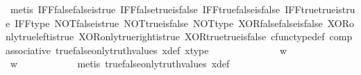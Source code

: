 \begin{isabellebody}
\ {\isacharparenleft}{\kern0pt}metis\ IFF{\isacharunderscore}{\kern0pt}false{\isacharunderscore}{\kern0pt}false{\isacharunderscore}{\kern0pt}is{\isacharunderscore}{\kern0pt}true\ IFF{\isacharunderscore}{\kern0pt}false{\isacharunderscore}{\kern0pt}true{\isacharunderscore}{\kern0pt}is{\isacharunderscore}{\kern0pt}false\ IFF{\isacharunderscore}{\kern0pt}true{\isacharunderscore}{\kern0pt}false{\isacharunderscore}{\kern0pt}is{\isacharunderscore}{\kern0pt}false\ IFF{\isacharunderscore}{\kern0pt}true{\isacharunderscore}{\kern0pt}true{\isacharunderscore}{\kern0pt}is{\isacharunderscore}{\kern0pt}true\ IFF{\isacharunderscore}{\kern0pt}type\ NOT{\isacharunderscore}{\kern0pt}false{\isacharunderscore}{\kern0pt}is{\isacharunderscore}{\kern0pt}true\ NOT{\isacharunderscore}{\kern0pt}true{\isacharunderscore}{\kern0pt}is{\isacharunderscore}{\kern0pt}false\ NOT{\isacharunderscore}{\kern0pt}type\ XOR{\isacharunderscore}{\kern0pt}false{\isacharunderscore}{\kern0pt}false{\isacharunderscore}{\kern0pt}is{\isacharunderscore}{\kern0pt}false\ XOR{\isacharunderscore}{\kern0pt}only{\isacharunderscore}{\kern0pt}true{\isacharunderscore}{\kern0pt}left{\isacharunderscore}{\kern0pt}is{\isacharunderscore}{\kern0pt}true\ XOR{\isacharunderscore}{\kern0pt}only{\isacharunderscore}{\kern0pt}true{\isacharunderscore}{\kern0pt}right{\isacharunderscore}{\kern0pt}is{\isacharunderscore}{\kern0pt}true\ XOR{\isacharunderscore}{\kern0pt}true{\isacharunderscore}{\kern0pt}true{\isacharunderscore}{\kern0pt}is{\isacharunderscore}{\kern0pt}false\ cfunc{\isacharunderscore}{\kern0pt}type{\isacharunderscore}{\kern0pt}def\ comp{\isacharunderscore}{\kern0pt}associative\ true{\isacharunderscore}{\kern0pt}false{\isacharunderscore}{\kern0pt}only{\isacharunderscore}{\kern0pt}truth{\isacharunderscore}{\kern0pt}values\ x{\isacharunderscore}{\kern0pt}def\ x{\isacharunderscore}{\kern0pt}type{\isacharparenright}{\kern0pt}\isanewline
\ \ \ \ \isamarkupfalse%
\ \isanewline
\ \ \ \ \ \ \isamarkupfalse%
\ {\isachardoublequoteopen}w\ {\isasymnoteq}\ {\isasymt}{\isachardoublequoteclose}\isanewline
\ \ \ \ \ \ \isamarkupfalse%
\ \isamarkupfalse%
\ {\isachardoublequoteopen}w\ {\isacharequal}{\kern0pt}\ {\isasymf}{\isachardoublequoteclose}\isanewline
\ \ \ \ \ \ \ \ \isamarkupfalse%
\ {\isacharparenleft}{\kern0pt}metis\ true{\isacharunderscore}{\kern0pt}false{\isacharunderscore}{\kern0pt}only{\isacharunderscore}{\kern0pt}truth{\isacharunderscore}{\kern0pt}values\ x{\isacharunderscore}{\kern0pt}def{\isacharparenright}{\kern0pt}\isanewline
\ \ \ \ \ \ \isamarkupfalse%

\end{isabellebody}
